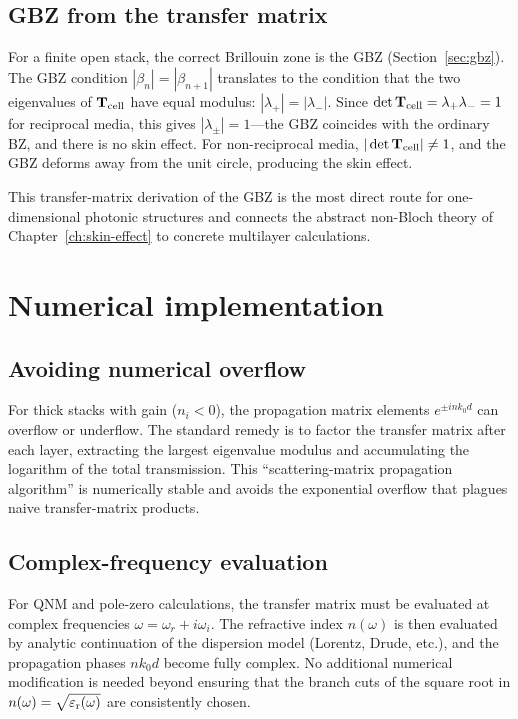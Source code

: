 \subsection{GBZ from the transfer matrix}
\label{ssec:gbz-transfer}

For a finite open stack, the correct Brillouin zone is the GBZ
(Section~\ref{sec:gbz}). The GBZ condition $|\beta_n| = |\beta_{n+1}|$
translates to the condition that the two eigenvalues of
$\mathbf{T}_{\mathrm{cell}}$ have equal modulus:
$|\lambda_+| = |\lambda_-|$. Since $\det\mathbf{T}_{\mathrm{cell}} =
\lambda_+\lambda_- = 1$ for reciprocal media, this gives
$|\lambda_\pm| = 1$---the GBZ coincides with the ordinary BZ, and there
is no skin effect. For non-reciprocal media,
$|\det\mathbf{T}_{\mathrm{cell}}| \neq 1$, and the GBZ deforms away from
the unit circle, producing the skin effect.

This transfer-matrix derivation of the GBZ is the most direct route
for one-dimensional photonic structures and connects the abstract
non-Bloch theory of Chapter~\ref{ch:skin-effect} to concrete
multilayer calculations.


\section{Numerical implementation}
\label{sec:transfer-numerical}

\subsection{Avoiding numerical overflow}
\label{ssec:overflow}

For thick stacks with gain ($n_i < 0$), the propagation matrix
elements $e^{\pm i n k_0 d}$ can overflow or underflow. The standard
remedy is to factor the transfer matrix after each layer, extracting
the largest eigenvalue modulus and accumulating the logarithm of the
total transmission. This ``scattering-matrix propagation algorithm''
is numerically stable and avoids the exponential overflow that plagues
naive transfer-matrix products.

\subsection{Complex-frequency evaluation}
\label{ssec:complex-freq}

For QNM and pole-zero calculations, the transfer matrix must be
evaluated at complex frequencies $\omega = \omega_r + i\omega_i$.
The refractive index $n(\omega)$ is then evaluated by analytic
continuation of the dispersion model (Lorentz, Drude, etc.), and the
propagation phases $n k_0 d$ become fully complex. No additional
numerical modification is needed beyond ensuring that the branch cuts
of the square root in $n(\omega) = \sqrt{\varepsilon_{\mathrm{r}}(\omega)}$ are
consistently chosen.


